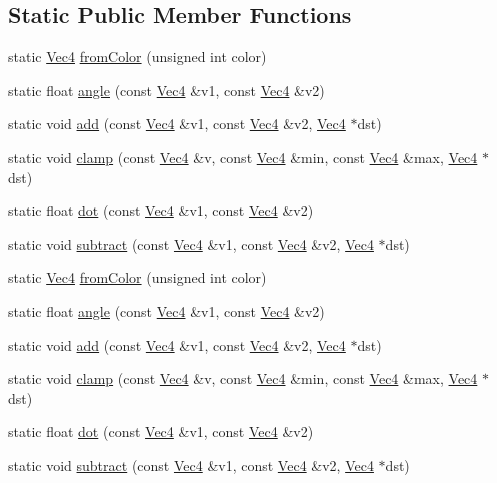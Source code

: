 \subsection*{Static Public Member Functions}
\begin{DoxyCompactItemize}
\item 
static \hyperlink{classVec4}{Vec4} \hyperlink{classVec4_aa13cf3fb8849cfce32630bc182f968a7}{from\+Color} (unsigned int color)
\item 
static float \hyperlink{classVec4_a752d36b33793b7e14e01e6cfdf8d7291}{angle} (const \hyperlink{classVec4}{Vec4} \&v1, const \hyperlink{classVec4}{Vec4} \&v2)
\item 
static void \hyperlink{classVec4_ae40a85b3f098873a51f082dcdf0a1add}{add} (const \hyperlink{classVec4}{Vec4} \&v1, const \hyperlink{classVec4}{Vec4} \&v2, \hyperlink{classVec4}{Vec4} $\ast$dst)
\item 
static void \hyperlink{classVec4_a954fe309f2bf86f02ccfca04636465aa}{clamp} (const \hyperlink{classVec4}{Vec4} \&v, const \hyperlink{classVec4}{Vec4} \&min, const \hyperlink{classVec4}{Vec4} \&max, \hyperlink{classVec4}{Vec4} $\ast$dst)
\item 
static float \hyperlink{classVec4_a53674f90d78a84d1096a845a930f70ec}{dot} (const \hyperlink{classVec4}{Vec4} \&v1, const \hyperlink{classVec4}{Vec4} \&v2)
\item 
static void \hyperlink{classVec4_a4174afb933be8ea56b7c13d607beaa08}{subtract} (const \hyperlink{classVec4}{Vec4} \&v1, const \hyperlink{classVec4}{Vec4} \&v2, \hyperlink{classVec4}{Vec4} $\ast$dst)
\item 
static \hyperlink{classVec4}{Vec4} \hyperlink{classVec4_a0c7fecd1d84722314be6bb090eb6e7fa}{from\+Color} (unsigned int color)
\item 
static float \hyperlink{classVec4_ae105bfcb7c4e92a739bc520d95732bca}{angle} (const \hyperlink{classVec4}{Vec4} \&v1, const \hyperlink{classVec4}{Vec4} \&v2)
\item 
static void \hyperlink{classVec4_a12f4cac2536f4dae24113fae41e0088c}{add} (const \hyperlink{classVec4}{Vec4} \&v1, const \hyperlink{classVec4}{Vec4} \&v2, \hyperlink{classVec4}{Vec4} $\ast$dst)
\item 
static void \hyperlink{classVec4_abb02b8149220e022961a048d078fab59}{clamp} (const \hyperlink{classVec4}{Vec4} \&v, const \hyperlink{classVec4}{Vec4} \&min, const \hyperlink{classVec4}{Vec4} \&max, \hyperlink{classVec4}{Vec4} $\ast$dst)
\item 
static float \hyperlink{classVec4_a351cd022fea2ae6af625001f532c1b2f}{dot} (const \hyperlink{classVec4}{Vec4} \&v1, const \hyperlink{classVec4}{Vec4} \&v2)
\item 
static void \hyperlink{classVec4_a4708aea515ff00b56faaf7ae39745427}{subtract} (const \hyperlink{classVec4}{Vec4} \&v1, const \hyperlink{classVec4}{Vec4} \&v2, \hyperlink{classVec4}{Vec4} $\ast$dst)
\end{DoxyCompactItemize}
